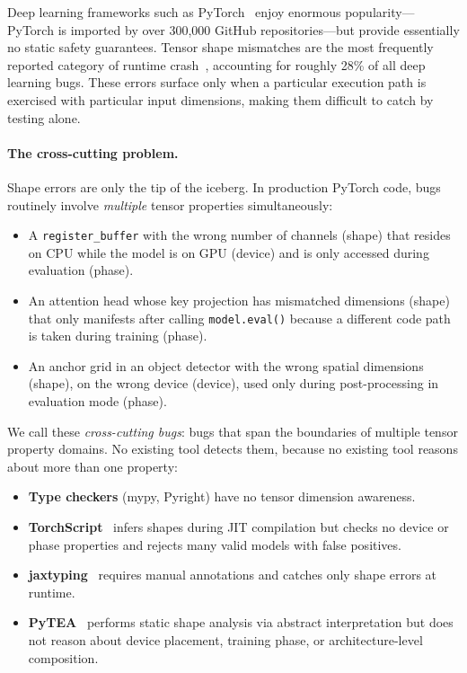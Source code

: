 \documentclass[10pt]{article}
\theoremstyle{plain}
\theoremstyle{definition}
\theoremstyle{remark}
\begin{document}
Deep learning frameworks such as PyTorch~\cite{paszke19} enjoy
enormous popularity---PyTorch is imported by over 300{,}000 GitHub
repositories---but provide essentially no static safety guarantees.
Tensor shape mismatches are the most frequently reported category of
runtime crash~\cite{islam19,zhang18}, accounting for roughly 28\% of
all deep learning bugs.  These errors surface only when a particular
execution path is exercised with particular input dimensions,
making them difficult to catch by testing alone.

\paragraph{The cross-cutting problem.}
Shape errors are only the tip of the iceberg.  In production PyTorch
code, bugs routinely involve \emph{multiple} tensor properties
simultaneously:

\begin{itemize}[leftmargin=1.5em]
  \item A \texttt{register\_buffer} with the wrong number of channels
    (shape) that resides on CPU while the model is on GPU (device) and
    is only accessed during evaluation (phase).

  \item An attention head whose key projection has mismatched
    dimensions (shape) that only manifests after calling
    \texttt{model.eval()} because a different code path is taken
    during training (phase).

  \item An anchor grid in an object detector with the wrong spatial
    dimensions (shape), on the wrong device (device), used only during
    post-processing in evaluation mode (phase).
\end{itemize}

\noindent
We call these \emph{cross-cutting bugs}: bugs that span the boundaries
of multiple tensor property domains.  No existing tool detects them,
because no existing tool reasons about more than one property:

\begin{itemize}[leftmargin=1.5em]
  \item \textbf{Type checkers} (mypy, Pyright) have no tensor
    dimension awareness.

  \item \textbf{TorchScript}~\cite{torchscript} infers shapes during
    JIT compilation but checks no device or phase properties and
    rejects many valid models with false positives.

  \item \textbf{jaxtyping}~\cite{jaxtyping} requires manual
    annotations and catches only shape errors at runtime.

  \item \textbf{PyTEA}~\cite{pytea} performs static shape analysis
    via abstract interpretation but does not reason about device
    placement, training phase, or architecture-level composition.
\end{itemize}
\end{document}
